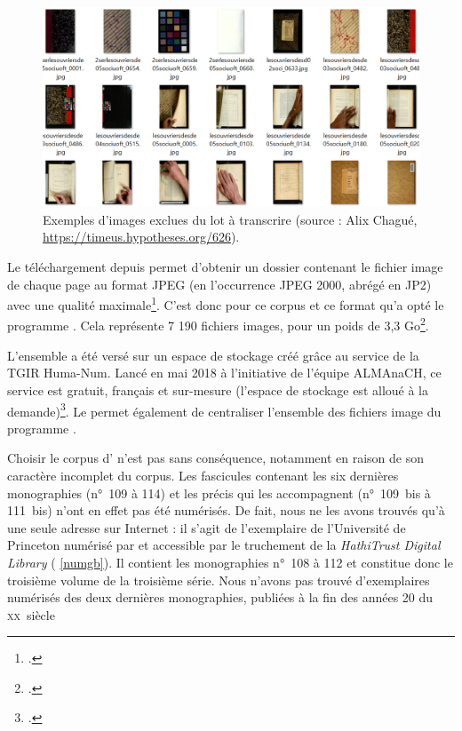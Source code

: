 \begin{figure}[h]
    \centering
    \includegraphics[width=15cm]{img/ex_tri.png}
    \caption{Exemples d'images exclues du lot à transcrire (source : Alix Chagué, \url{https://timeus.hypotheses.org/626}).}
    \label{fig:ex_tri}
\end{figure}

Le téléchargement depuis \ia{} permet d'obtenir un dossier contenant le fichier image de chaque page au format JPEG (en l'occurrence JPEG 2000, abrégé en JP2) avec une qualité maximale\footcite{chague2}. C'est donc pour ce corpus et ce format qu'a opté le programme \timeus. Cela représente 7 190 fichiers images, pour un poids de 3,3 Go\footcite{chague2}.

L'ensemble a été versé sur un espace de stockage créé grâce au service \sharedocs de la TGIR Huma-Num. Lancé en mai 2018 à l'initiative de l'équipe ALMAnaCH, ce service est gratuit, français et sur-mesure (l'espace de stockage est alloué à la demande)\footcite[p. 33-34]{chague2}. Le \sharedocs{} permet également de centraliser l'ensemble des fichiers image du programme \timeus.

Choisir le corpus d'\ia{} n'est pas sans conséquence, notamment en raison de son caractère incomplet du corpus. Les fascicules contenant les six dernières monographies (n°~109 à 114) et les précis qui les accompagnent (n°~109~bis à 111~bis) n'ont en effet pas été numérisés. De fait, nous ne les avons trouvés qu'à une seule adresse sur Internet : il s'agit de l'exemplaire de l'Université de Princeton numérisé par \gb{} et accessible par le truchement de la \textit{HathiTrust Digital Library} (\ann{} \ref{numgb}). Il contient les monographies n°~108 à 112 et constitue donc le troisième volume de la troisième série. Nous n'avons pas trouvé d'exemplaires numérisés des deux dernières monographies, publiées à la fin des années 20 du \textsc{xx}\ieme~siècle

